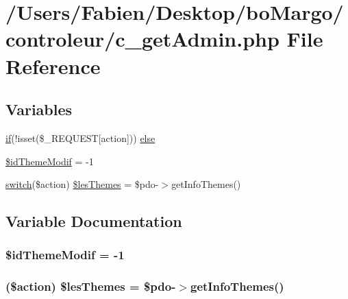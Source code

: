 \hypertarget{c__get_admin_8php}{}\section{/\+Users/\+Fabien/\+Desktop/bo\+Margo/controleur/c\+\_\+get\+Admin.php File Reference}
\label{c__get_admin_8php}
\subsection*{Variables}
\begin{DoxyCompactItemize}
\item 
\hyperlink{bootstrap_8min_8js_a87cf461060832b8b68a7b48d9e371e4f}{if}(!isset(\$\+\_\+\+R\+E\+Q\+U\+E\+S\+T\mbox{[}\textquotesingle{}action\textquotesingle{}\mbox{]})) \hyperlink{c__get_admin_8php_a9eb9d4aea63ebe6f016e561ea73b210a}{else}
\item 
\hyperlink{c__get_admin_8php_acfe0a7ee43270b8fbce8b8f650551608}{\$id\+Theme\+Modif} = -\/1
\item 
\hyperlink{index_8php_a6160ae6d9a60bbcc19780fa9bc2c9b41}{switch}(\$action) \hyperlink{c__get_admin_8php_a0de8dc3e71799280b5388e92459216c2}{\$les\+Themes} = \$pdo-\/$>$get\+Info\+Themes()
\end{DoxyCompactItemize}


\subsection{Variable Documentation}
\hypertarget{c__get_admin_8php_acfe0a7ee43270b8fbce8b8f650551608}{}
\subsubsection[{\$id\+Theme\+Modif}]{\setlength{\rightskip}{0pt plus 5cm}\$id\+Theme\+Modif = -\/1}\label{c__get_admin_8php_acfe0a7ee43270b8fbce8b8f650551608}
\hypertarget{c__get_admin_8php_a0de8dc3e71799280b5388e92459216c2}{}
\subsubsection[{\$les\+Themes}]{ (\$action) \$les\+Themes = \$pdo-\/$>$get\+Info\+Themes()}\label{c__get_admin_8php_a0de8dc3e71799280b5388e92459216c2}
\hypertarget{c__get_admin_8php_a9eb9d4aea63ebe6f016e561ea73b210a}{}
